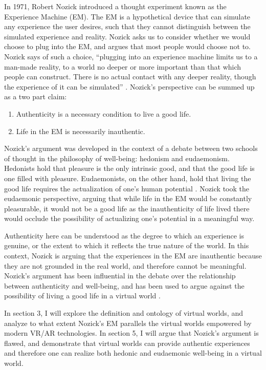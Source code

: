 In 1971, Robert Nozick introduced a thought experiment known as the Experience
Machine (EM). The EM is a hypothetical device that can simulate any experience
the user desires, such that they cannot distinguish between the simulated
experience and reality. Nozick asks us to consider whether we would choose to
plug into the EM, and argues that most people would choose not to. Nozick says 
of such a choice, ``plugging into an experience machine limits us to a man-made
reality, to a world no deeper or more important than that which people can
construct. There is no actual contact with any deeper reality, though the
experience of it can be simulated'' \citep{Nozick1974-NOZASA}. Nozick's 
perspective can be summed up as a two part claim:
\begin{enumerate}
    \item Authenticity is a necessary condition to live a good life.
    \item Life in the EM is necessarily inauthentic.
\end{enumerate}

Nozick's argument was developed in the context of a debate between two schools 
of thought in the philosophy of well-being: hedonism and eudaemonism. Hedonists
hold that pleasure is the only intrinsic good, and that the good life is one
filled with pleasure. Eudaemonists, on the other hand, hold that living the good
life requires the actualization of one's human potential \citep{Ryan_Deci_2001}.
Nozick took the eudaemonic perspective, arguing that while life in the EM would
be constantly pleasurable, it would not be a good life as the inauthenticity of
life lived there would occlude the possibility of actualizing one's potential in
a meaningful way.

Authenticity here can be understood as the degree to which an experience is
genuine, or the extent to which it reflects the true nature of the world. In
this context, Nozick is arguing that the experiences in the EM are inauthentic
because they are not grounded in the real world, and therefore cannot be
meaningful. Nozick's argument has been influential in the debate over the
relationship between authenticity and well-being, and has been used to argue
against the possibility of living a good life in a virtual world
\citep{Slater2020}.

In section 3, I will explore the definition and ontology of virtual worlds, and
analyze to what extent Nozick's EM parallels the virtual worlds empowered by
modern VR/AR technologies. In section 5, I will argue that Nozick's argument is
flawed, and demonstrate that virtual worlds can provide authentic experiences
and therefore one can realize both hedonic and eudaemonic well-being in a
virtual world.
